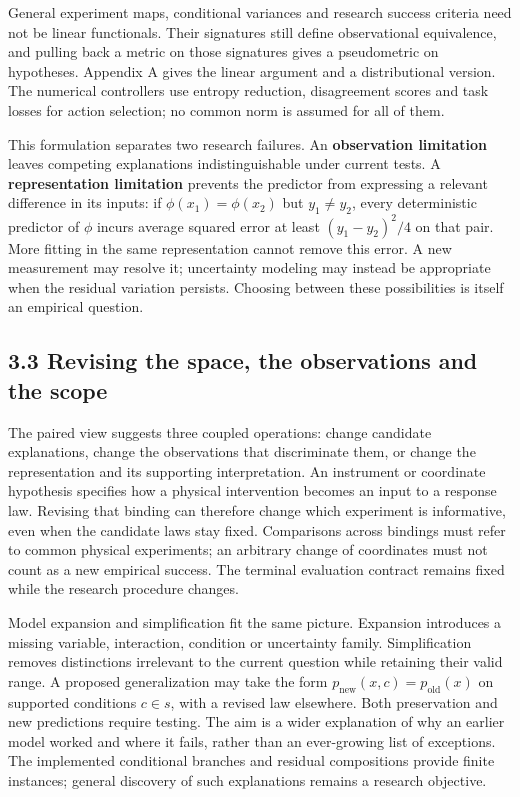 \documentclass[11pt,a4paper]{article}
\begin{document}
General experiment maps, conditional variances and research success criteria need not be linear functionals. Their signatures still define observational equivalence, and pulling back a metric on those signatures gives a pseudometric on hypotheses. Appendix A gives the linear argument and a distributional version. The numerical controllers use entropy reduction, disagreement scores and task losses for action selection; no common norm is assumed for all of them.


This formulation separates two research failures. An \textbf{observation limitation} leaves competing explanations indistinguishable under current tests. A \textbf{representation limitation} prevents the predictor from expressing a relevant difference in its inputs: if \(\phi(x_1)=\phi(x_2)\) but \(y_1\ne y_2\), every deterministic predictor of \(\phi\) incurs average squared error at least \((y_1-y_2)^2/4\) on that pair. More fitting in the same representation cannot remove this error. A new measurement may resolve it; uncertainty modeling may instead be appropriate when the residual variation persists. Choosing between these possibilities is itself an empirical question.


\subsection*{3.3 Revising the space, the observations and the scope}

The paired view suggests three coupled operations: change candidate explanations, change the observations that discriminate them, or change the representation and its supporting interpretation. An instrument or coordinate hypothesis specifies how a physical intervention becomes an input to a response law. Revising that binding can therefore change which experiment is informative, even when the candidate laws stay fixed. Comparisons across bindings must refer to common physical experiments; an arbitrary change of coordinates must not count as a new empirical success. The terminal evaluation contract remains fixed while the research procedure changes.


Model expansion and simplification fit the same picture. Expansion introduces a missing variable, interaction, condition or uncertainty family. Simplification removes distinctions irrelevant to the current question while retaining their valid range. A proposed generalization may take the form \(p_{\mathrm{new}}(x,c)=p_{\mathrm{old}}(x)\) on supported conditions \(c\in s\), with a revised law elsewhere. Both preservation and new predictions require testing. The aim is a wider explanation of why an earlier model worked and where it fails, rather than an ever-growing list of exceptions. The implemented conditional branches and residual compositions provide finite instances; general discovery of such explanations remains a research objective.
\end{document}
